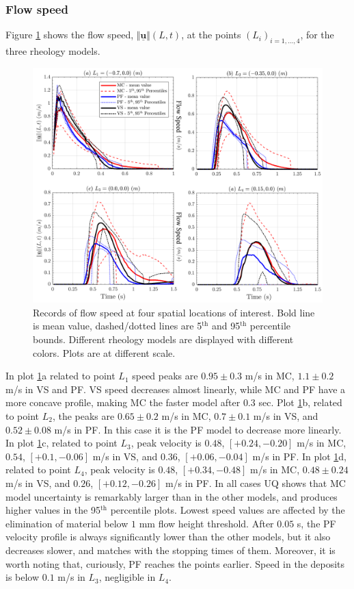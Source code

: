 \documentclass{article}
\begin{document}
\subsubsection{Flow speed}
Figure \ref{fig:Ramp-Vel} shows the flow speed, $\Vert \underline{\mathbf{u}} \Vert(L,t)$, at the points $(L_i)_{i=1,\dots,4}$, for the three rheology models.
\begin{figure}[H]
         \centering
        \includegraphics[width=1\textwidth]{InclinedPlane/LocalMeasurments/Velocity_Inc.png}
        \caption{Records of flow speed at four spatial locations of interest. Bold line is mean value, dashed/dotted lines are 5$^{\mathrm{th}}$ and 95$^{\mathrm{th}}$ percentile bounds. Different rheology models are displayed with different colors. Plots are at different scale.}
        \label{fig:Ramp-Vel}
\end{figure}
In plot \ref{fig:Ramp-Vel}a related to point $L_1$ speed peaks are $0.95 \pm 0.3$ m/s in MC, $1.1 \pm 0.2$ m/s in VS and PF. VS speed decreases almost linearly, while MC and PF have a more concave profile, making MC the faster model after $0.3$ sec. Plot \ref{fig:Ramp-Vel}b, related to point $L_2$, the peaks are $0.65 \pm 0.2$ m/s in MC, $0.7 \pm 0.1$ m/s in VS, and $0.52 \pm 0.08$ m/s in PF. In this case it is the PF model to decrease more linearly. In plot \ref{fig:Ramp-Vel}c, related to point $L_3$, peak velocity is $0.48$, $[+0.24, -0.20]$ m/s in MC, $0.54$, $[+0.1, -0.06]$ m/s in VS, and $0.36$, $[+0.06, -0.04]$ m/s in PF. In plot \ref{fig:Ramp-Vel}d, related to point $L_4$, peak velocity is $0.48$, $[+0.34, -0.48]$ m/s in MC, $0.48\pm 0.24$ m/s in VS, and $0.26$, $[+0.12, -0.26]$ m/s in PF. In all cases UQ shows that MC model uncertainty is remarkably larger than in the other models, and produces higher values in the 95$^{\mathrm{th}}$ percentile plots. Lowest speed values are affected by the elimination of material below $1$ mm flow height threshold. After $0.05$ s, the PF velocity profile is always significantly lower than the other models, but it also decreases slower, and matches with the stopping times of them. Moreover, it is worth noting that, curiously, PF reaches the points earlier. Speed in the deposits is below $0.1$ m/s in $L_3$, negligible in $L_4$.
\end{document}

